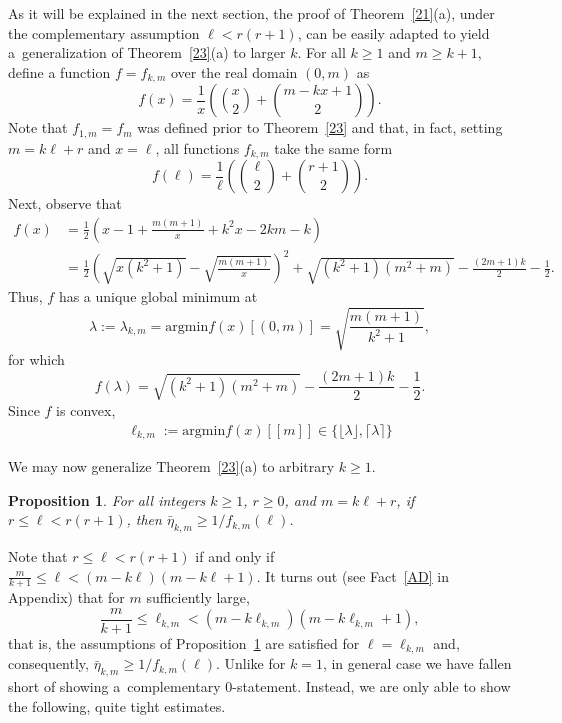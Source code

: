 \documentclass[reqno, 12pt]{amsart}
\numberwithin{equation}{section}
\numberwithin{figure}{section}
\def\argmin{\text{argmin}}
\theoremstyle{plain}
\newtheorem{prop}[thm]{Proposition}
\theoremstyle{definition}
\begin{document}
As it will be explained in the next section, the proof of Theorem~\ref{21}(a), under the complementary assumption $\ell<r(r+1)$, can be easily adapted to yield a~generalization of Theorem~\ref{23}(a) to larger $k$.
For all $k\ge1$ and $m\ge k+1$, define a function $f=f_{k,m}$ over the real domain $(0,m)$ as
\[ f(x)=\frac1{x}\left(\binom x2+\binom{m-kx+1}{2}\right).\]
Note that $f_{1,m}=f_m$ was defined prior to Theorem~\ref{23} and that, in fact, setting $m=k\ell+r$ and $x=\ell$, all functions $f_{k,m}$ take the same form
$$f(\ell)=\frac1{\ell}\left(\binom \ell2+\binom{r+1}{2}\right).$$
Next, observe that
\begin{align*}
f(x) &= \frac12\left( x-1 + \frac{m(m+1)}{x} + k^2x - 2km - k \right)\\	
&= \frac12\left(\sqrt{x(k^2+1)} - \sqrt{\frac{m(m+1)}{x}} \right)^2 + \sqrt{(k^2+1)(m^2+m)} - \frac{(2m+1)k}{2} - \frac12.
\end{align*}
Thus, $f$ has a unique global minimum at
\[
\lambda:=\lambda_{k,m} = \argmin f(x)[(0,m)]=\sqrt{\frac{m(m+1)}{k^2+1}},
\]
for which
\begin{equation}\label{lambdakm}
f(\lambda) = \sqrt{(k^2+1)(m^2+m)} - \frac{(2m+1)k}{2} - \frac12.
\end{equation}
	Since $f$ is convex,
	\begin{align*}
	\ell_{k,m}:=\argmin f(x)[[m]]\in\{\lfloor\lambda\rfloor, \lceil\lambda\rceil\}
	\end{align*}


We may now generalize Theorem~\ref{23}(a) to arbitrary $k\ge1$. %
 \begin{prop}\label{23k}
 For all integers $k\ge1$, $r\ge0$,  and $m=k\ell+r$, if $r\le \ell<r(r+1)$, then $\bar\eta_{k,m}\ge 1/f_{k,m}(\ell)$.
\end{prop}

Note that $r\le \ell<r(r+1)$ if and only if $\frac m{k+1}\le\ell<(m-k\ell)(m-k\ell+1)$. It turns out (see Fact~\ref{AD} in Appendix) that for $m$ sufficiently large,
\begin{equation}\label{ellkm}
\frac m{k+1}\le\ell_{k,m}<(m-k\ell_{k,m})(m-k\ell_{k,m}+1),
\end{equation}
that is, the assumptions of Proposition~\ref{23k} are satisfied for $\ell=\ell_{k,m}$ and, consequently,
 $\bar\eta_{k,m}\ge 1/f_{k,m}(\ell)$.
Unlike for $k=1$, in general case we have fallen short of showing a~complementary 0-statement. Instead, we are only able to show the following, quite tight estimates.
\end{document}
